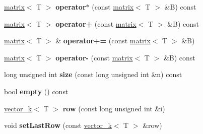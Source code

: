 \begin{DoxyCompactItemize}
\item 
\hypertarget{classkeycpp_1_1matrix_add1f4ca03e1cce57574c905ab7ca89fe}{\hyperlink{classkeycpp_1_1matrix}{matrix}$<$ T $>$ {\bfseries operator$\ast$} (const \hyperlink{classkeycpp_1_1matrix}{matrix}$<$ T $>$ \&B) const }\label{classkeycpp_1_1matrix_add1f4ca03e1cce57574c905ab7ca89fe}

\item 
\hypertarget{classkeycpp_1_1matrix_a8c0520cf5064379afa5128cf7f660832}{\hyperlink{classkeycpp_1_1matrix}{matrix}$<$ T $>$ {\bfseries operator+} (const \hyperlink{classkeycpp_1_1matrix}{matrix}$<$ T $>$ \&B) const }\label{classkeycpp_1_1matrix_a8c0520cf5064379afa5128cf7f660832}

\item 
\hypertarget{classkeycpp_1_1matrix_a78655e73267b48e16909a68291f4c074}{\hyperlink{classkeycpp_1_1matrix}{matrix}$<$ T $>$ \& {\bfseries operator+=} (const \hyperlink{classkeycpp_1_1matrix}{matrix}$<$ T $>$ \&B)}\label{classkeycpp_1_1matrix_a78655e73267b48e16909a68291f4c074}

\item 
\hypertarget{classkeycpp_1_1matrix_a1c6cb00f8859e6486a7054f11b1c7e6a}{\hyperlink{classkeycpp_1_1matrix}{matrix}$<$ T $>$ {\bfseries operator-\/} (const \hyperlink{classkeycpp_1_1matrix}{matrix}$<$ T $>$ \&B) const }\label{classkeycpp_1_1matrix_a1c6cb00f8859e6486a7054f11b1c7e6a}

\item 
\hypertarget{classkeycpp_1_1matrix_a64df749d122ac1272738836329e76b24}{long unsigned int {\bfseries size} (const long unsigned int \&n) const }\label{classkeycpp_1_1matrix_a64df749d122ac1272738836329e76b24}

\item 
\hypertarget{classkeycpp_1_1matrix_ad522f701e86eafc344d8904d4f0a8f19}{bool {\bfseries empty} () const }\label{classkeycpp_1_1matrix_ad522f701e86eafc344d8904d4f0a8f19}

\item 
\hypertarget{classkeycpp_1_1matrix_ad8fe3c5d70837cf529f35c85196f3890}{\hyperlink{classkeycpp_1_1vector__k}{vector\-\_\-k}$<$ T $>$ {\bfseries row} (const long unsigned int \&i)}\label{classkeycpp_1_1matrix_ad8fe3c5d70837cf529f35c85196f3890}

\item 
\hypertarget{classkeycpp_1_1matrix_a5fc527ff5096ff162580db9c9eb1637e}{void {\bfseries set\-Last\-Row} (const \hyperlink{classkeycpp_1_1vector__k}{vector\-\_\-k}$<$ T $>$ \&row)}\label{classkeycpp_1_1matrix_a5fc527ff5096ff162580db9c9eb1637e}


\end{DoxyCompactItemize}
